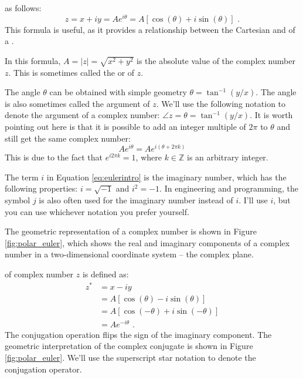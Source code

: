  as follows:
\begin{equation}
\boxed{
z = x + iy = A e^{i\theta} = A[\cos(\theta)+i\sin(\theta)]
}\,\,.
\label{eq:eulerintro}
\end{equation}
This formula is useful, as it provides a relationship between the Cartesian and  of a .

In this formula, $A = |z|=\sqrt{x^2 + y^2}$ is the absolute value of the complex number $z$. This is sometimes called the \emph{} or
\emph{} of $z$.

The angle $\theta$ can be obtained with simple geometry
$\theta=\tan^{-1}(y/x)$. The angle is also sometimes called the argument of $z$. We'll use the following notation to denote the argument of a complex number: $\angle z = \theta = \tan^{-1}(y/x)$. It is worth pointing out here is that it is possible to add an integer multiple of $2\pi$ to $\theta$ and still get the same complex number:
\begin{equation}
A e^{i\theta} = A e^{i(\theta + 2\pi k)}
\end{equation}
This is due to the fact that $e^{i2\pi k} = 1$, where
$k \in \mathbb{Z}$ is an arbitrary integer. 

The term $i$ in Equation \ref{eq:eulerintro} is the imaginary number, which has the following properties: $i=\sqrt{-1}$ and $i^2 = -1$. In engineering and programming, the symbol $j$ is also often used for the
imaginary number instead of $i$. I'll use $i$, but you can use whichever notation you prefer yourself.

The geometric representation of a complex number is shown in
Figure \ref{fig:polar_euler}, which shows the real and imaginary
components of a complex number in a two-dimensional coordinate system
-- the complex plane.


 of complex number $z$ is defined as:
\begin{align}
z^* &= x - iy \\
    &=A[\cos(\theta)-i\sin(\theta)]\\
    &=A[\cos(-\theta)+i\sin(-\theta)]\\
    &=A e^{-i\theta}\,\,.
\end{align}
The conjugation operation flips the sign of the imaginary
component. The geometric interpretation of the complex conjugate is
shown in Figure \ref{fig:polar_euler}.  We'll use the superscript star
notation to denote the conjugation operator.

